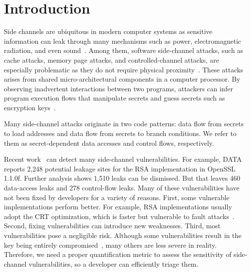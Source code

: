 \section{Introduction} 
Side channels are ubiquitous in modern computer systems as sensitive
information can leak through many mechanisms such as power,
electromagnetic radiation, and even
sound~\cite{agrawal2002side,kar20178,chari1999towards,217605,genkin2014rsa}.
Among them, software side-channel attacks, such as cache attacks, memory page
attacks, and controlled-channel attacks, are especially problematic as they do not require physical proximity~\cite{7163052,217543,217589,lee2017inferring,191010,liu2015last}. These
attacks arises from shared micro-architectural components in a computer processor.
By observing inadvertent interactions between two programs, attackers can infer program
execution flows that manipulate secrets and guess secrets such as encryption
keys~\cite{Osvik2006,Gullasch:2011:CGB:2006077.2006784,203878,10.1007/978-3-540-45238-6_6}.


Many side-channel attacks originate
in two code patterns: data flow from secrets to load
addresses and data flow from secrets to branch conditions. We refer to them as
secret-dependent data accesses and control flows, respectively. 

Recent work~\cite{203878,217537,Wichelmann:2018:MFF:3274694.3274741,Brotzman19Casym,236338,182946}
can detect many side-channel vulnerabilities. For example,
DATA~\cite{217537} reports 2,248 potential leakage sites for the RSA
implementation in OpenSSL 1.1.0f\@. 
Further analysis shows 1,510 leaks can be dismissed. But that
leaves 460 data-access leaks and 278 control-flow leaks. 
Many of these vulnerabilities have not been fixed by developers for a variety of reasons.
First, some vulnerable implementations perform better. For example,
RSA implementations usually adopt the CRT optimization,
which is faster but vulnerable to fault attacks~\cite{aumuller2002fault}.
Second, fixing vulnerabilities can introduce new 
weaknesses.
Third, most vulnerabilities pose a negligible risk. 
Although some vulnerabilities result in the key being 
entirely compromised~\cite{184415, aumuller2002fault}, 
many others are less
severe in reality. Therefore, we need a proper quantification metric to 
assess the sensitivity of side-channel vulnerabilities,
so a developer can efficiently triage them.


